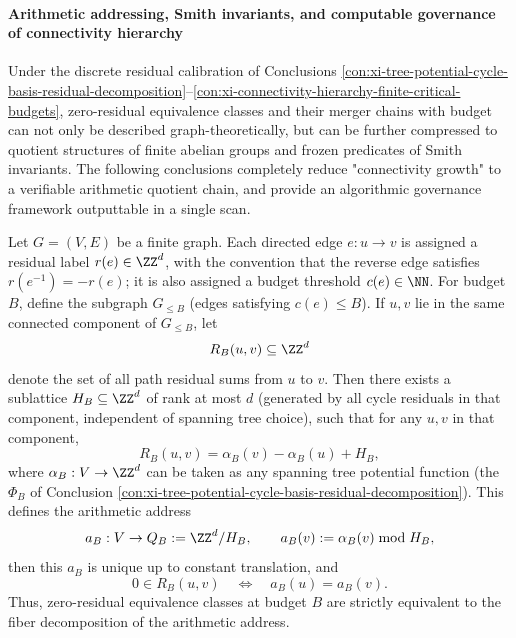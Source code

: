 
\paragraph{Arithmetic addressing, Smith invariants, and computable governance of connectivity hierarchy}
Under the discrete residual calibration of Conclusions \ref{con:xi-tree-potential-cycle-basis-residual-decomposition}--\ref{con:xi-connectivity-hierarchy-finite-critical-budgets}, zero-residual equivalence classes and their merger chains with budget can not only be described graph-theoretically, but can be further compressed to quotient structures of finite abelian groups and frozen predicates of Smith invariants.
The following conclusions completely reduce "connectivity growth" to a verifiable arithmetic quotient chain, and provide an algorithmic governance framework outputtable in a single scan.

\begin{conclusion}\label{con:xi-arithmetic-address-existence-uniqueness}
Let \(G=(V,E)\) be a finite graph.
Each directed edge \(e:u\to v\) is assigned a residual label \(r(e)\in\ZZ^d\), with the convention that the reverse edge satisfies \(r(e^{-1})=-r(e)\);
it is also assigned a budget threshold \(c(e)\in\NN\).
For budget \(B\), define the subgraph \(G_{\le B}\) (edges satisfying \(c(e)\le B\)).
If \(u,v\) lie in the same connected component of \(G_{\le B}\), let
\[
R_B(u,v)\subseteq\ZZ^d
\]
denote the set of all path residual sums from \(u\) to \(v\).
Then there exists a sublattice \(H_B\subseteq\ZZ^d\) of rank at most \(d\) (generated by all cycle residuals in that component, independent of spanning tree choice), such that for any \(u,v\) in that component,
\[
R_B(u,v)=\alpha_B(v)-\alpha_B(u)+H_B,
\]
where \(\alpha_B:V\to\ZZ^d\) can be taken as any spanning tree potential function (the \(\Phi_B\) of Conclusion \ref{con:xi-tree-potential-cycle-basis-residual-decomposition}).
This defines the arithmetic address
\[
a_B:V\to Q_B:=\ZZ^d/H_B,
\qquad
a_B(v):=\alpha_B(v)\bmod H_B,
\]
then this \(a_B\) is unique up to constant translation, and
\[
0\in R_B(u,v)\quad\Longleftrightarrow\quad a_B(u)=a_B(v).
\]
Thus, zero-residual equivalence classes at budget \(B\) are strictly equivalent to the fiber decomposition of the arithmetic address.
\end{conclusion}

